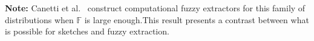 \documentclass[11pt]{article}
\newcommand{\class}[1]{{\ensuremath{\mathsf{#1}}}}
\newcommand{\gen}{\ensuremath{\class{Gen}}\xspace}
\newcommand{\rep}{\ensuremath{\class{Rep}}\xspace}
\newcommand{\zo}{\ensuremath{\{0, 1\}}}
\begin{document}
\textbf{Note:} Canetti et al.~\cite[Construction 5.3]{canetti2014key} construct computational fuzzy extractors for this family of distributions when $\mathbb{F}$ is large enough.This result presents a contrast between what is possible for sketches and fuzzy extraction.

\end{document}
